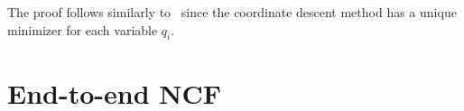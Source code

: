 \documentclass[poms,final,blindrev]{poms1_V1} %
\begin{document}
 The proof follows similarly to~\cite{luenberger1984linear} %
since the coordinate descent method has a unique minimizer for each variable $q_i$. \Halmos \endproof















\section{End-to-end NCF}
\end{document}
